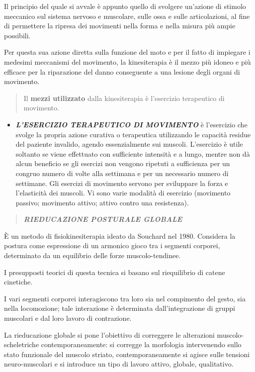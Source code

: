 \documentclass[]{article}
\begin{document}
Il principio del quale si avvale è appunto quello di svolgere un'azione
di stimolo meccanico sul sistema nervoso e muscolare, sulle ossa e sulle
articolazioni, al fine di permettere la ripresa dei movimenti nella
forma e nella misura più ampie possibili.

Per questa sua azione diretta sulla funzione del moto e per il fatto di
impiegare i medesimi meccanismi del movimento, la kinesiterapia è il
mezzo più idoneo e più efficace per la riparazione del danno conseguente
a una lesione degli organi di movimento.

\begin{quote}
Il \textbf{mezzi utilizzato} dalla kinesiterapia è l'esercizio
terapeutico di movimento.
\end{quote}

\begin{itemize}
\item
  \textbf{\emph{L'ESERCIZIO TERAPEUTICO DI MOVIMENTO}} è l'esercizio che
  svolge la propria azione curativa o terapeutica utilizzando le
  capacità residue del paziente invalido, agendo essenzialmente sui
  muscoli. L'esercizio è utile soltanto se viene effettuato con
  sufficiente intensità e a lungo, mentre non dà alcun beneficio se gli
  esercizi non vengono ripetuti a sufficienza per un congruo numero di
  volte alla settimana e per un necessario numero di settimane. Gli
  esercizi di movimento servono per sviluppare la forza e l'elasticità
  dei muscoli. Vi sono varie modalità di esercizio (movimento passivo;
  movimento attivo; attivo contro una resistenza).
\end{itemize}

\begin{quote}
\textbf{\emph{RIEDUCAZIONE POSTURALE GLOBALE}}
\end{quote}

È un metodo di fisiokinesiterapia ideato da Souchard nel 1980. Considera
la postura come espressione di un armonico gioco tra i segmenti
corporei, determinato da un equilibrio delle forze muscolo-tendinee.

I presupposti teorici di questa tecnica si basano sul riequilibrio di
catene cinetiche.

I vari segmenti corporei interagiscono tra loro sia nel compimento del
gesto, sia nella locomozione; tale interazione è determinata
dall'integrazione di gruppi muscolari e dal loro lavoro di contrazione.

La rieducazione globale si pone l'obiettivo di correggere le alterazioni
muscolo-scheletriche contemporaneamente: si corregge la morfologia
intervenendo sullo stato funzionale del muscolo striato,
contemporaneamente si agisce sulle tensioni neuro-muscolari e si
introduce un tipo di lavoro attivo, globale, qualitativo.
\end{document}
